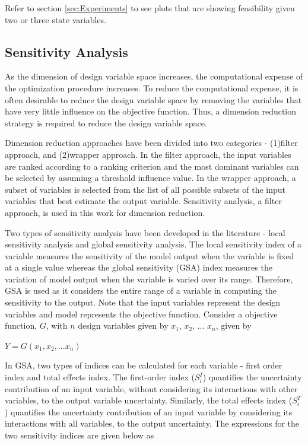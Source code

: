 \documentclass[10pt]{article}
\begin{document}
Refer to section \ref{sec:Experiments} to see plots that are showing feasibility given two or three state variables.

\subsection{Sensitivity Analysis}
\label{sec:Sensitivity}
\hspace{5 mm} As the dimension of design variable space increases, the computational expense of the optimization procedure increases. To reduce the computational expense, it is often desirable to reduce the design variable space by removing the variables that have very little influence on the objective function. Thus, a dimension reduction strategy is required to reduce the design variable space. 

Dimension reduction approaches have been divided into two categories - (1)filter approach, and (2)wrapper approach. In the filter approach, the input variables are ranked according to a ranking criterion and the most dominant variables can be selected by assuming a threshold influence value. In the wrapper approach, a subset of variables is selected from the list of all possible subsets of the input variables that best estimate the output variable. Sensitivity analysis, a filter approach, is used in this work for dimension reduction. 

Two types of sensitivity analysis have been developed in the literature - local sensitivity analysis and global sensitivity analysis. The local sensitivity index of a variable measures the sensitivity of the model output when the variable is fixed at a single value whereas the global sensitivity (GSA) index measures the variation of model output when the variable is varied over its range. Therefore, GSA is used as it considers the entire range of a variable in computing the sensitivity to the output. Note that the input variables represent the design variables and model represents the objective function.
Consider a objective function, $G$, with $n$ design variables given by $x_{1}$, $x_{2}$, ...  $x_{n}$, given by

\centerline{$Y = G(x_{1}, x_{2}, ... x_{n})$}

In GSA, two types of indices can be calculated for each variable - first order index and total effects index. The first-order index ($S_{i}^{I}$) quantifies the uncertainty contribution of an input variable, without considering its interactions with other variables, to the output variable uncertainty. Similarly, the total effects index ($S_{i}^{T}$) quantifies the uncertainty contribution of an input variable by considering its interactions with all variables, to the output uncertainty. The expressions for the two sensitivity indices are given below as 
\end{document}
